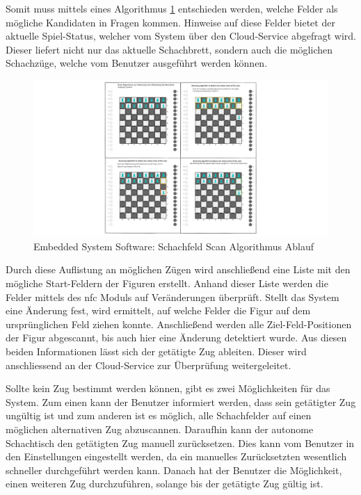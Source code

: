 Somit muss mittels eines Algorithmus \ref{ATC_ChessMoveAlgorithm}
entschieden werden, welche Felder als mögliche Kandidaten in Fragen
kommen. Hinweise auf diese Felder bietet der aktuelle Spiel-Status,
welcher vom System über den Cloud-Service abgefragt wird. Dieser liefert
nicht nur das aktuelle Schachbrett, sondern auch die möglichen
Schachzüge, welche vom Benutzer ausgeführt werden können.

\begin{figure}
\centering
\includegraphics{images/ATC_ChessMoveAlgorithm.png}
\caption{Embedded System Software: Schachfeld Scan Algorithmus Ablauf
\label{ATC_ChessMoveAlgorithm}}
\end{figure}

Durch diese Auflistung an möglichen Zügen wird anschließend eine Liste
mit den mögliche Start-Feldern der Figuren erstellt. Anhand dieser Liste
werden die Felder mittels des \gls{nfc} Moduls auf Veränderungen
überprüft. Stellt das System eine Änderung fest, wird ermittelt, auf
welche Felder die Figur auf dem ursprünglichen Feld ziehen konnte.
Anschließend werden alle Ziel-Feld-Positionen der Figur abgescannt, bis
auch hier eine Änderung detektiert wurde. Aus diesen beiden
Informationen lässt sich der getätigte Zug ableiten. Dieser wird
anschliessend an der Cloud-Service zur Überprüfung weitergeleitet.

Sollte kein Zug bestimmt werden können, gibt es zwei Möglichkeiten für
das System. Zum einen kann der Benutzer informiert werden, dass sein
getätigter Zug ungültig ist und zum anderen ist es möglich, alle
Schachfelder auf einen möglichen alternativen Zug abzuscannen. Daraufhin
kann der autonome Schachtisch den getätigten Zug manuell zurücksetzen.
Dies kann vom Benutzer in den Einstellungen eingestellt werden, da ein
manuelles Zurücksetzten wesentlich schneller durchgeführt werden kann.
Danach hat der Benutzer die Möglichkeit, einen weiteren Zug
durchzuführen, solange bis der getätigte Zug gültig ist.

